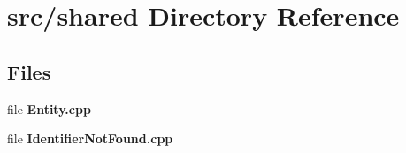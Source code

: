 \section{src/shared Directory Reference}
\label{dir_4f38db07240614f25134cb9a8bebbaf9}
\subsection*{Files}
\begin{DoxyCompactItemize}
\item 
file {\bf Entity.\+cpp}
\item 
file {\bf Identifier\+Not\+Found.\+cpp}
\end{DoxyCompactItemize}
